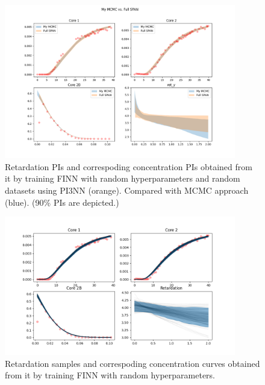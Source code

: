 \documentclass{article}
\begin{document}
\begin{figure}
    \centering
    \includegraphics[width=0.9\textwidth]{figs/finn_My MCMCvsFull SPAN_PIs.png}
    \caption{Retardation PIs and correspoding concentration PIs obtained from it by training FINN with random hyperparameters and random datasets using PI3NN (orange). Compared with MCMC approach (blue). (90\% PIs are depicted.)}
    \label{fig:mcmc_vs_fullspan}
\end{figure}


\begin{figure}
    \centering
    \includegraphics[width=0.9\textwidth]{figs/finn_span_samples.png}
    \caption{Retardation samples and correspoding concentration curves obtained from it by training FINN with random hyperparameters.}
    \label{fig:span_samples}
\end{figure}
\end{document}
